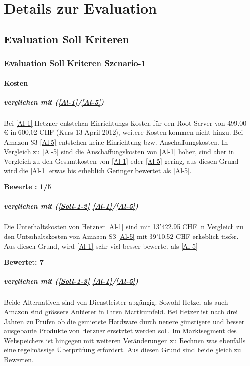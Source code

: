 \cleardoublepage
\chapter{Details zur Evaluation}
\section{Evaluation Soll Kriteren}
\subsection{Evaluation Soll Kriteren Szenario-1}

\subsubsection{Kosten}

\paragraph*{  verglichen mit  (\ref{Al-1}/\ref{Al-5})}
Bei \ref{Al-1} Hetzner entstehen Einrichtungs-Kosten für den Root Server von 499.00 € in 600,02 CHF (Kurs 13 April 2012), weitere Kosten kommen nicht hinzu. Bei Amazon S3 \ref{Al-5} entstehen keine Einrichtung bzw. Anschaffungskosten. In Vergleich zu \ref{Al-5} sind die Anschaffungskosten von \ref{Al-1} höher, sind aber in Vergleich zu den Gesamtkosten von \ref{Al-1} oder \ref{Al-5} gering, aus diesen Grund wird die \ref{Al-1} etwas bis erheblich Geringer bewertet als \ref{Al-5}.

\textbf{Bewertet: 1/5}

\paragraph*{  verglichen mit  (\ref{Soll-1-2} \ref{Al-1}/\ref{Al-5})}
Die Unterhaltskosten von Hetzner \ref{Al-1} sind mit 13'422.95 CHF in Vergleich zu den Unterhaltskosten von Amazon S3 \ref{Al-5} mit 39'10.52 CHF erheblich tiefer. Aus diesen Grund, wird \ref{Al-1} sehr viel besser bewertet als \ref{Al-5}

\textbf{Bewertet: 7}

\paragraph*{  verglichen mit  (\ref{Soll-1-3} \ref{Al-1}/\ref{Al-5})}
Beide Alternativen sind von Dienstleister abgängig. Sowohl Hetzer als auch Amazon sind grössere Anbieter in Ihren Martkumfeld. Bei Hetzer ist nach drei Jahren zu Prüfen ob die gemietete Hardware durch neuere günstigere und besser ausgebaute Produkte von Hetzner ersetztet werden soll. Im Marktsegment des Webspeichers ist hingegen mit weiteren Veränderungen zu Rechnen was ebenfalls eine regelmässige Überprüfung erfordert. Aus diesen Grund sind beide gleich zu Bewerten.

